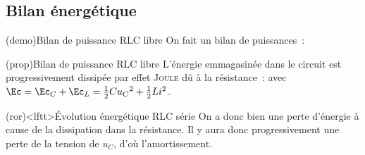 \documentclass[../../main/main.tex]{subfiles}
\begin{document}
\subsection{Bilan énergétique}
\begin{tcb*}[label=demo:rcenerg-charge](demo){Bilan de puissance RLC libre}
	On fait un bilan de puissances~:
	\vspace{-15pt}
\end{tcb*}
\begin{tcb*}[label=prop:lcenerg-décharge](prop){Bilan de puissance RLC libre}
	L'énergie emmagasinée dans le circuit est progressivement dissipée par
	effet \textsc{Joule} dû à la résistance~:
	\psw{%
		\[
			\boxed{\dv{\Ec}{t} = -\Pc_J}
		\]
	}%
	avec $\Ec = \Ec_C + \Ec_L = \frac{1}{2}Cu_C{}^2 + \frac{1}{2}Li^2$.
\end{tcb*}
\begin{tcb}[label=ror:amortissement, cnt, bld]
	(ror)<lftt>{Évolution énergétique RLC série}
	On a donc bien une perte d'énergie à cause de la dissipation dans la
	résistance. Il y aura donc progressivement une perte de la tension
	de $u_C$, d'où l'amortissement.
\end{tcb}
\end{document}
